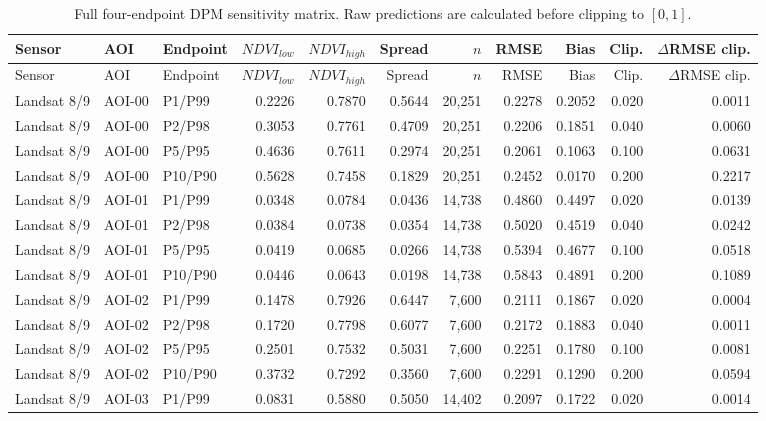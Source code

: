 \begin{landscape}\scriptsize
\setlength{\LTleft}{0pt}\setlength{\LTright}{0pt}
\begin{longtable}{lllrrrrrrrr}
\caption{Full four-endpoint DPM sensitivity matrix. Raw predictions are calculated before clipping to $[0,1]$.}\label{tab:dpm-all48}\\
\toprule Sensor & AOI & Endpoint & $NDVI_{low}$ & $NDVI_{high}$ & Spread & $n$ & RMSE & Bias & Clip. & $\Delta$RMSE clip. \\ \midrule
\endfirsthead
\toprule Sensor & AOI & Endpoint & $NDVI_{low}$ & $NDVI_{high}$ & Spread & $n$ & RMSE & Bias & Clip. & $\Delta$RMSE clip. \\ \midrule
\endhead
Landsat 8/9 & AOI-00 & P1/P99 & 0.2226 & 0.7870 & 0.5644 & 20,251 & 0.2278 & 0.2052 & 0.020 & 0.0011 \\
Landsat 8/9 & AOI-00 & P2/P98 & 0.3053 & 0.7761 & 0.4709 & 20,251 & 0.2206 & 0.1851 & 0.040 & 0.0060 \\
Landsat 8/9 & AOI-00 & P5/P95 & 0.4636 & 0.7611 & 0.2974 & 20,251 & 0.2061 & 0.1063 & 0.100 & 0.0631 \\
Landsat 8/9 & AOI-00 & P10/P90 & 0.5628 & 0.7458 & 0.1829 & 20,251 & 0.2452 & 0.0170 & 0.200 & 0.2217 \\
Landsat 8/9 & AOI-01 & P1/P99 & 0.0348 & 0.0784 & 0.0436 & 14,738 & 0.4860 & 0.4497 & 0.020 & 0.0139 \\
Landsat 8/9 & AOI-01 & P2/P98 & 0.0384 & 0.0738 & 0.0354 & 14,738 & 0.5020 & 0.4519 & 0.040 & 0.0242 \\
Landsat 8/9 & AOI-01 & P5/P95 & 0.0419 & 0.0685 & 0.0266 & 14,738 & 0.5394 & 0.4677 & 0.100 & 0.0518 \\
Landsat 8/9 & AOI-01 & P10/P90 & 0.0446 & 0.0643 & 0.0198 & 14,738 & 0.5843 & 0.4891 & 0.200 & 0.1089 \\
Landsat 8/9 & AOI-02 & P1/P99 & 0.1478 & 0.7926 & 0.6447 & 7,600 & 0.2111 & 0.1867 & 0.020 & 0.0004 \\
Landsat 8/9 & AOI-02 & P2/P98 & 0.1720 & 0.7798 & 0.6077 & 7,600 & 0.2172 & 0.1883 & 0.040 & 0.0011 \\
Landsat 8/9 & AOI-02 & P5/P95 & 0.2501 & 0.7532 & 0.5031 & 7,600 & 0.2251 & 0.1780 & 0.100 & 0.0081 \\
Landsat 8/9 & AOI-02 & P10/P90 & 0.3732 & 0.7292 & 0.3560 & 7,600 & 0.2291 & 0.1290 & 0.200 & 0.0594 \\
Landsat 8/9 & AOI-03 & P1/P99 & 0.0831 & 0.5880 & 0.5050 & 14,402 & 0.2097 & 0.1722 & 0.020 & 0.0014 \\

\end{longtable}
\end{landscape}
